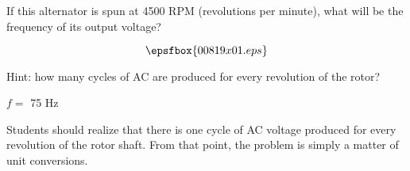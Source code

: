 

If this alternator is spun at 4500 RPM (revolutions per minute), what will be the frequency of its output voltage?

$$\epsfbox{00819x01.eps}$$

Hint: how many cycles of AC are produced for every revolution of the rotor?







$f =$ 75 Hz







Students should realize that there is one cycle of AC voltage produced for every revolution of the rotor shaft.  From that point, the problem is simply a matter of unit conversions.




